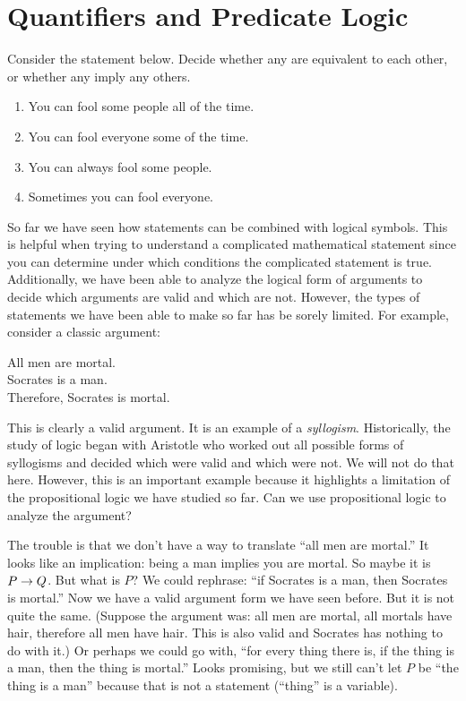 \documentclass[12pt]{article}
\begin{document}
\section{Quantifiers and Predicate Logic}


\begin{activity}
Consider the statement below.  Decide whether any are equivalent to each other, or whether any imply any others.

\begin{enumerate}
\item You can fool some people all of the time. 
\item You can fool everyone some of the time.
\item You can always fool some people.
\item Sometimes you can fool everyone.
\end{enumerate}

\end{activity}

So far we have seen how statements can be combined with logical symbols.  This is helpful when trying to understand a complicated mathematical statement since you can determine under which conditions the complicated statement is true.  Additionally, we have been able to analyze the logical form of arguments to decide which arguments are valid and which are not.  However, the types of statements we have been able to make so far has be sorely limited.  For example, consider a classic argument:

\begin{center}
 All men are mortal.\\ Socrates is a man. \\
 Therefore, Socrates is mortal.
\end{center}

This is clearly a valid argument.  It is an example of a \emph{syllogism}.  Historically, the study of logic began with Aristotle who worked out all possible forms of syllogisms and decided which were valid and which were not.  We will not do that here.  However, this is an important example because it highlights a limitation of the propositional logic we have studied so far.  Can we use propositional logic to analyze the argument?  

The trouble is that we don't have a way to translate ``all men are mortal.''  It looks like an implication: being a man implies you are mortal.  So maybe it is $P \rightarrow Q$.  But what is $P$?  We could rephrase: ``if Socrates is a man, then Socrates is mortal.''  Now we have a valid argument form we have seen before.  But it is not quite the same.  (Suppose the argument was: all men are mortal, all mortals have hair, therefore all men have hair.  This is also valid and Socrates has nothing to do with it.)  Or perhaps we could go with, ``for every thing there is, if the thing is a man, then the thing is mortal.''  Looks promising, but we still can't let $P$ be ``the thing is a man'' because that is not a statement (``thing'' is a variable).
\end{document}
